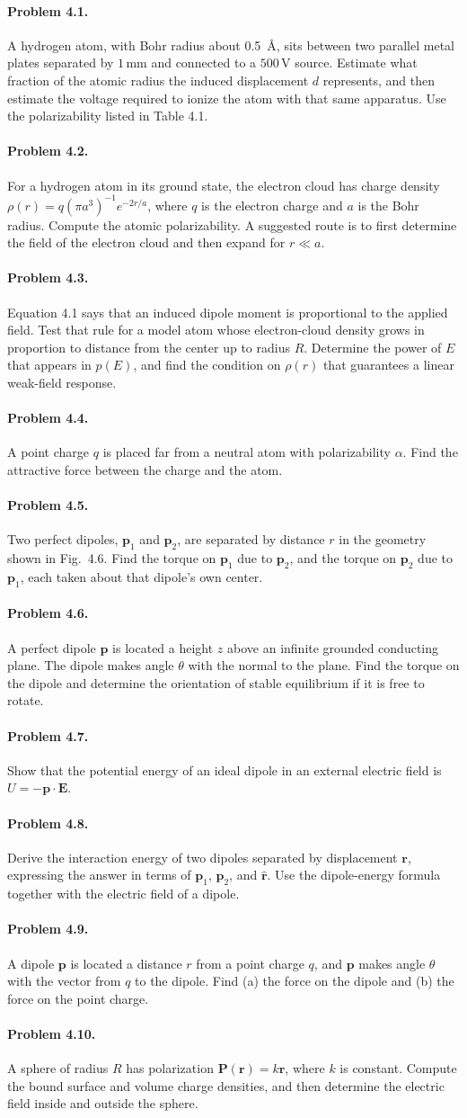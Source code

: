 \documentclass{aa}
\newcommand{\problemstatement}[2]{%
\paragraph{Problem #1.}#2\par\medskip
}
\begin{document}
\problemstatement{4.1}{A hydrogen atom, with Bohr radius about 0.5~\AA, sits between two parallel metal plates separated by \(1\,\mathrm{mm}\) and connected to a \(500\,\mathrm{V}\) source. Estimate what fraction of the atomic radius the induced displacement \(d\) represents, and then estimate the voltage required to ionize the atom with that same apparatus. Use the polarizability listed in Table 4.1.}
\problemstatement{4.2}{For a hydrogen atom in its ground state, the electron cloud has charge density \(\rho(r)=q(\pi a^3)^{-1}e^{-2r/a}\), where \(q\) is the electron charge and \(a\) is the Bohr radius. Compute the atomic polarizability. A suggested route is to first determine the field of the electron cloud and then expand for \(r\ll a\).}
\problemstatement{4.3}{Equation 4.1 says that an induced dipole moment is proportional to the applied field. Test that rule for a model atom whose electron-cloud density grows in proportion to distance from the center up to radius \(R\). Determine the power of \(E\) that appears in \(p(E)\), and find the condition on \(\rho(r)\) that guarantees a linear weak-field response.}
\problemstatement{4.4}{A point charge \(q\) is placed far from a neutral atom with polarizability \(\alpha\). Find the attractive force between the charge and the atom.}
\problemstatement{4.5}{Two perfect dipoles, \(\mathbf p_1\) and \(\mathbf p_2\), are separated by distance \(r\) in the geometry shown in Fig.~4.6. Find the torque on \(\mathbf p_1\) due to \(\mathbf p_2\), and the torque on \(\mathbf p_2\) due to \(\mathbf p_1\), each taken about that dipole's own center.}
\problemstatement{4.6}{A perfect dipole \(\mathbf p\) is located a height \(z\) above an infinite grounded conducting plane. The dipole makes angle \(\theta\) with the normal to the plane. Find the torque on the dipole and determine the orientation of stable equilibrium if it is free to rotate.}
\problemstatement{4.7}{Show that the potential energy of an ideal dipole in an external electric field is \(U=-\mathbf p\cdot\mathbf E\).}
\problemstatement{4.8}{Derive the interaction energy of two dipoles separated by displacement \(\mathbf r\), expressing the answer in terms of \(\mathbf p_1\), \(\mathbf p_2\), and \(\hat{\mathbf r}\). Use the dipole-energy formula together with the electric field of a dipole.}
\problemstatement{4.9}{A dipole \(\mathbf p\) is located a distance \(r\) from a point charge \(q\), and \(\mathbf p\) makes angle \(\theta\) with the vector from \(q\) to the dipole. Find (a) the force on the dipole and (b) the force on the point charge.}
\problemstatement{4.10}{A sphere of radius \(R\) has polarization \(\mathbf P(\mathbf r)=k\mathbf r\), where \(k\) is constant. Compute the bound surface and volume charge densities, and then determine the electric field inside and outside the sphere.}
\end{document}
